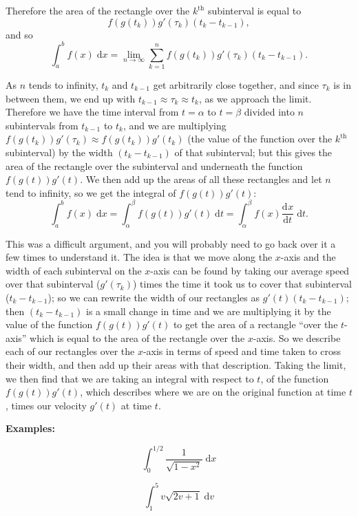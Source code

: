 \documentclass{article}
\newcommand{\deriv}[3][]{\frac{\mathrm{d}^{#1}#2}{\mathrm{d}#3^{#1}}}
\newcommand{\diff}{\;\mathrm{d}}
\begin{document}
Therefore the area of the rectangle over the $k^\mathrm{th}$ subinterval is equal to
\[f(g(t_k))g'(\tau_k)(t_k-t_{k-1}),\]
and so
\[\int_a^b f(x)\diff x = \lim_{n\to \infty}\sum_{k=1}^n f(g(t_k))g'(\tau_k)(t_k-t_{k-1}).\]

As $n$ tends to infinity, $t_k$ and $t_{k-1}$ get arbitrarily close together, and since $\tau_k$ is in between them, we end up with $t_{k-1}\approx \tau_k\approx t_k$, as we approach the limit. Therefore we have the time interval from $t=\alpha$ to $t=\beta$ divided into $n$ subintervals from $t_{k-1}$ to $t_k$, and we are multiplying $f(g(t_k))g'(\tau_k)\approx f(g(t_k))g'(t_k)$ (the value of the function over the $k^\mathrm{th}$ subinterval) by the width $(t_k-t_{k-1})$ of that subinterval; but this gives the area of the rectangle over the subinterval and underneath the function $f(g(t))g'(t)$. We then add up the areas of all these rectangles and let $n$ tend to infinity, so we get the integral of $f(g(t))g'(t)$:
\[\int_a^b f(x)\diff x = \int_\alpha^\beta f(g(t))g'(t)\diff t=\int_\alpha^\beta f(x)\deriv{x}{t}\diff t.\]\bigskip



This was a difficult argument, and you will probably need to go back over it a few times to understand it. The idea is that we move along the $x$-axis and the width of each subinterval on the $x$-axis can be found by taking our average speed over that subinterval ($g'(\tau_k)$) times the time it took us to cover that subinterval ($t_k-t_{k-1}$); so we can rewrite the width of our rectangles as $g'(t) (t_k-t_{k-1})$; then $(t_k-t_{k-1})$ is a small change in time and we are multiplying it by the value of the function $f(g(t))g'(t)$ to get the area of a rectangle ``over the $t$-axis'' which is equal to the area of the rectangle over the $x$-axis. So we describe each of our rectangles over the $x$-axis in terms of speed and time taken to cross their width, and then add up their areas with that description. Taking the limit, we then find that we are taking an integral with respect to $t$, of the function $f(g(t))g'(t)$, which describes where we are on the original function at time $t$, times our velocity $g'(t)$ at time $t$.\bigskip


\textbf{Examples:}\medskip


\[\int_0^{1/2} \frac{1}{\sqrt{1-x^2}}\diff x\]


\vfill


\[\int_1^5 v\sqrt{2v+1} \diff v\]

\vfill
\end{document}
